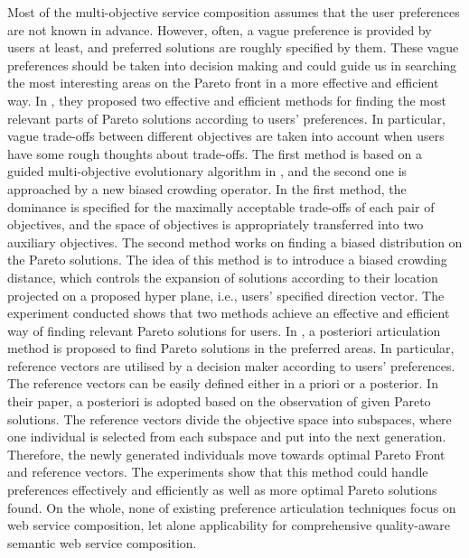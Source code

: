Most of the multi-objective service composition assumes that the user preferences are not known in advance. However,  often, a vague preference is provided by users at least, and preferred solutions are roughly specified by them.  These vague preferences should be taken into decision making and could guide us in searching the most interesting areas on the Pareto front in a more effective and efficient way. In \cite{branke2005integrating}, they proposed two effective and efficient methods for finding the most relevant parts of Pareto solutions according to users' preferences. In particular, vague trade-offs between different objectives are taken into account when users have some rough thoughts about trade-offs.  The first method is based on a guided multi-objective evolutionary algorithm in \cite{branke2001guidance}, and the second one is approached by a new biased crowding operator. In the first method, the dominance is specified for the maximally acceptable trade-offs of each pair of objectives, and the space of objectives is appropriately transferred into two auxiliary objectives. The second method works on finding a biased distribution on the Pareto solutions. The idea of this method is to introduce a biased crowding distance, which controls the expansion of solutions according to their location projected on a proposed hyper plane, i.e., users' specified direction vector.  The experiment conducted shows that two methods achieve an effective and efficient way of finding relevant Pareto solutions for users. In \cite{cheng2015reference}, a posteriori articulation method is proposed to find Pareto solutions in the preferred areas. In particular, reference vectors are utilised by a decision maker according to users' preferences. The reference vectors can be easily defined either in a priori or a posterior. In their paper, a posteriori is adopted based on the observation of given Pareto solutions. The reference vectors divide the objective space into subspaces, where one individual is selected from each subspace and put into the next generation. Therefore, the newly generated individuals move towards optimal Pareto Front and reference vectors. The experiments show that this method could handle preferences effectively and efficiently as well as more optimal Pareto solutions found. On the whole, none of existing preference articulation techniques focus on web service composition, let alone applicability for comprehensive quality-aware semantic web service composition. 



